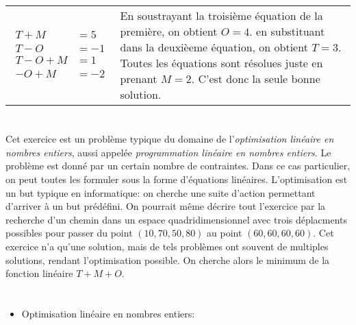{{\begin{tabularx}{\columnwidth}{ @{} l J @{} }
  ${\begin{aligned} T + M &= 5 \\ T - O &= -1 \\ T - O + M &= 1 \\ - O + M &= -2 \end{aligned}}$ & En soustrayant la troisième équation de la première, on obtient ${O = 4}$. en substituant dans la deuxièeme équation, on obtient ${T = 3}$. Toutes les équations sont résolues juste en prenant ${M = 2}$. C’est donc la seule bonne solution.
\end{tabularx}



\section*{\BrochureItsInformatics}
Cet exercice est un problème typique du domaine de l’\emph{optimisation linéaire en nombres entiers}, aussi appelée \emph{programmation linéaire en nombres entiers}. Le problème est donné par un certain nombre de contraintes. Dans ce cas particulier, on peut toutes les formuler sous la forme d’équations linéaires. L’optimisation est un but typique en informatique: on cherche une suite d’action permettant d’arriver à un but prédéfini.
On pourrait même décrire tout l’exercice par la recherche d’un chemin dans un espace quadridimensionnel avec trois déplacments possibles pour passer du point ${(10,70,50,80)}$ au point ${(60,60,60,60)}$. Cet exercice n’a qu’une solution, mais de tels problèmes ont souvent de multiples solutions, rendant l’optimisation possible. On cherche alors le minimum de la fonction linéaire ${T + M + O}$.



\section*{\BrochureWebsitesAndKeywords}
{\raggedright
\begin{itemize}
  \item Optimisation linéaire en nombres entiers: \href{https://fr.wikipedia.org/wiki/Optimisation_lin\%C3\%A9aire_en_nombres_entiers}{}
\end{itemize}


}}}
